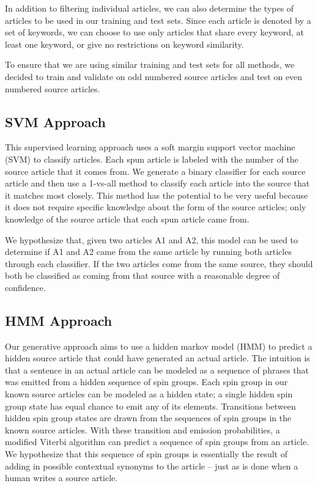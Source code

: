 \documentclass[11pt,letterpaper,oneside, titlepage]{scrartcl}
\begin{document}
In addition to filtering individual articles, we can also determine the types of articles to be used in our training and test sets. Since each article is denoted by a set of keywords, we can choose to use only articles that share every keyword, at least one keyword, or give no restrictions on keyword similarity.

To ensure that we are using similar training and test sets for all methods, we decided to train and validate on odd numbered source articles and test on even numbered source articles.

\subsection{SVM Approach}

This supervised learning approach uses a soft margin support vector machine (SVM) to classify articles. Each spun article is labeled with the number of the source article that it comes from. We generate a binary classifier for each source article and then use a 1-vs-all method to classify each article into the source that it matches most closely. This method has the potential to be very useful because it does not require specific knowledge about the form of the source articles; only knowledge of the source article that each spun article came from.

We hypothesize that, given two articles A1 and A2, this model can be used to determine if A1 and A2 came from the same article by running both articles through each classifier. If the two articles come from the same source, they should both be classified as coming from that source with a reasonable degree of confidence.

\subsection{HMM Approach}

Our generative approach aims to use a hidden markov model (HMM) to predict a hidden source article that could have generated an actual article. The intuition is that a sentence in an actual article can be modeled as a sequence of phrases that was emitted from a hidden sequence of spin groups. Each spin group in our known source articles can be modeled as a hidden state; a single hidden spin group state has equal chance to emit any of its elements. Transitions between hidden spin group states are drawn from the sequences of spin groups in the known source articles. With these transition and emission probabilities, a modified Viterbi algorithm can predict a sequence of spin groups from an article. We hypothesize that this sequence of spin groups is essentially the result of adding in possible contextual synonyms to the article -- just as is done when a human writes a source article.
\end{document}
